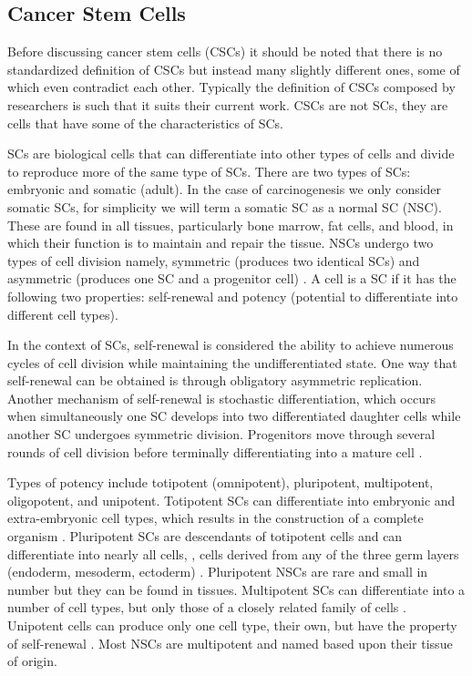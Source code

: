 \documentclass[\main/thesis.tex]{subfiles}
\begin{document}
\subsection{Cancer Stem Cells}

Before discussing cancer stem cells (CSCs) it should be noted that there is no standardized definition of CSCs but instead many slightly different ones, some of which even contradict each other. Typically the definition of CSCs composed by researchers is such that it suits their current work. CSCs are not SCs, they are cells that have some of the characteristics of SCs.

SCs are biological cells that can differentiate into other types of cells and divide to reproduce more of the same type of SCs. There are two types of SCs: embryonic and somatic (adult). In the case of carcinogenesis we only consider somatic SCs, for simplicity we will term a somatic SC as a normal SC (NSC). These are found in all tissues, particularly bone marrow, fat cells, and blood, in which their function is to maintain and repair the tissue. NSCs undergo two types of cell division namely, symmetric (produces two identical SCs) and asymmetric (produces one SC and a progenitor cell) \parencite{Beckmann}. A cell is a SC if it has the following two properties: self-renewal and potency (potential to differentiate into different cell types).

In the context of SCs, self-renewal is considered the ability to achieve numerous cycles of cell division while maintaining the undifferentiated state. One way that self-renewal can be obtained is through obligatory asymmetric replication. Another mechanism of self-renewal is stochastic differentiation, which occurs when simultaneously one SC develops into two differentiated daughter cells while another SC undergoes symmetric division. Progenitors move through several rounds of cell division before terminally differentiating into a mature cell \parencite{Beckmann}. 

Types of potency include totipotent (omnipotent), pluripotent, multipotent, oligopotent, and unipotent. Totipotent SCs can differentiate into embryonic and extra-embryonic cell types, which results in the construction of a complete organism \parencite{Scholer}. Pluripotent SCs are descendants of totipotent cells and can differentiate into nearly all cells, \ie, cells derived from any of the three germ layers (endoderm, mesoderm, ectoderm) \parencite{Scholer}. Pluripotent NSCs are rare and small in number but they can be found in tissues. Multipotent SCs can differentiate into a number of cell types, but only those of a closely related family of cells \parencite{Scholer}. Unipotent cells can produce only one cell type, their own, but have the property of self-renewal \parencite{Scholer}. Most NSCs are multipotent and named based upon their tissue of origin. 
\end{document}
